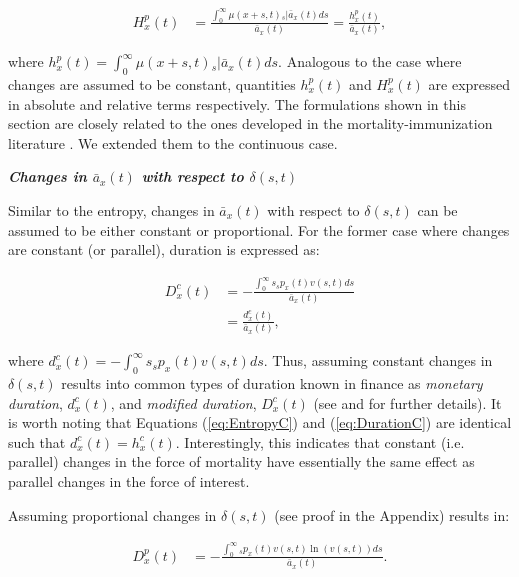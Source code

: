 \documentclass[12pt]{article}
\begin{document}
\begin{equation} \label{eq:EntropyP2}
\begin{split}
{H}^{p}_{x}(t) &=  \frac{\int_0^\infty \mu(x+s,t)   {}_s|\bar{a}_x(t) ds}{\bar{a}_x(t)} =  \frac{{h}^{p}_{x}(t)}{\bar{a}_x(t)}, 
\end{split}
\end{equation}

where ${h}^{p}_{x}(t)=\int_0^\infty \mu(x+s,t)   {}_s|\bar{a}_x(t) ds$. Analogous to the case where changes are assumed to be constant, quantities ${h}^{p}_{x}(t)$ and ${H}^{p}_{x}(t)$ are expressed in absolute and relative terms respectively. The formulations shown in this section are closely related to the ones developed in the mortality-immunization literature \citep{Tsai2013a,Lin2020}. We extended them to the continuous case. 
 

\textbf{\textit{{Changes in $\bar{a}_x(t)$ with respect to $\delta(s,t)$}}}

 Similar to the entropy, changes in $\bar{a}_x(t)$ with respect to $\delta(s,t)$ can be assumed to be either constant or proportional. For the former case where changes are constant (or parallel), duration is expressed as:

\begin{equation}\label{eq:DurationC}
\begin{split}
{D}^{c}_x(t)&= -\frac{\int_0^\infty s {}_sp_x(t) {v}(s,t)ds}{\bar{a}_x(t)} \\
&= \frac{{d}^{c}_x(t)}{\bar{a}_x(t)},
\end{split}
\end{equation}

where ${d}^{c}_x(t)=-\int_0^\infty s {}_sp_x(t) {v}(s,t)ds$. Thus, assuming constant changes in $\delta(s,t)$ results into common types of duration known in finance as \textit{monetary duration}, ${d}^{c}_x(t)$, and \textit{modified duration}, ${D}^{c}_x(t)$ (see \citet{Milevsky2012} and \citet{Tsai2013a} for further details). It is worth noting that Equations (\ref{eq:EntropyC}) and (\ref{eq:DurationC}) are identical such that ${d}^{c}_x(t)={h}^{c}_{x}(t)$. Interestingly, this indicates that constant (i.e. parallel) changes in the force of mortality have essentially the same effect as parallel changes in the force of interest.


Assuming proportional changes in $\delta(s,t)$ (see proof in the Appendix) results in: 


\begin{equation}\label{eq:DurationP}
\begin{split}
{D}^{p}_{x}(t) &= -\frac{\int_0^\infty {}_sp_x(t) v(s,t) \ln(v(s,t))ds}{\bar{a}_x(t)}. \\
\end{split}
\end{equation}
\end{document}
